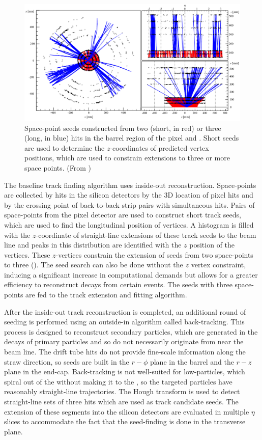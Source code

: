 \begin{figure}[t]
  \includegraphics[width=\linewidth]{soft-pub-2007-007_sp_seeds.png}
  \caption{Space-point seeds constructed from two (short, in red) or three (long, in blue) hits in the barrel region of the pixel and \sct. Short seeds are used to determine the $z$-coordinates of predicted vertex positions, which are used to constrain extensions to three or more space points.  (From )}
  \label{fig:trk_seeds}
\end{figure}

The baseline track finding algorithm uses inside-out reconstruction.
Space-points are collected by hits in the silicon detectors by the 3D location of pixel hits and by the crossing point of back-to-back \sct strip pairs with simultaneous hits.
Pairs of space-points from the pixel detector are used to construct short track seeds, which are used to find the longitudinal position of vertices.
A histogram is filled with the $z$-coordinate of straight-line extensions of these track seeds to the beam line and peaks in this distribution are identified with the $z$ position of the vertices.
These $z$-vertices constrain the extension of seeds from two space-points to three ().
The seed search can also be done without the $z$ vertex constraint, inducing a significant increase in computational demands but allows for a greater efficiency to reconstruct decays from certain events.
The seeds with three space-points are fed to the track extension and fitting algorithm.

After the inside-out track reconstruction is completed, an additional round of seeding is performed using an outside-in algorithm called back-tracking.
This process is designed to reconstruct secondary particles, which are generated in the decays of primary particles and so do not necessarily originate from near the beam line.
The \trt drift tube hits do not provide fine-scale information along the straw direction, so seeds are built in the $r - \phi$ plane in the \trt barrel and the $r - z$ plane in the \trt end-cap.
Back-tracking is not well-suited for low-\pt particles, which spiral out of the \id without making it to the \trt, so the targeted particles have reasonably straight-line trajectories.
The Hough transform \cite{Duda:1972:UHT:361237.361242} is used to detect straight-line sets of three \trt hits which are used as track candidate seeds.
The extension of these \trt segments into the silicon detectors are evaluated in multiple $\eta$ slices to accommodate the fact that the seed-finding is done in the transverse plane.

